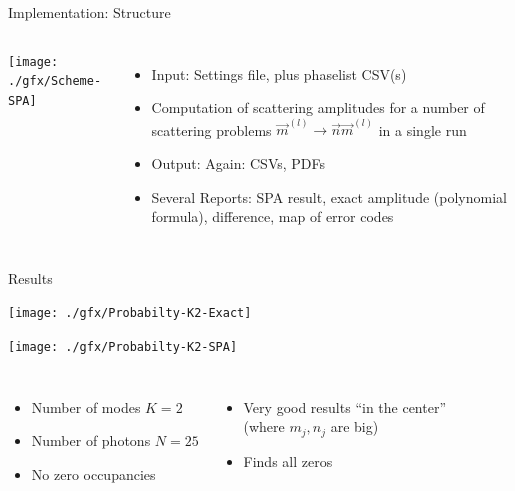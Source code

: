\begin{frame}{Implementation: Structure}
%
\vspace{-15pt}
\begin{columns}[t]
\begin{center}
	\texttt{[image: ./gfx/Scheme-SPA]}
\end{center}
%
\begin{itemize}
\item Input: Settings file, plus phaselist CSV(s)
\item Computation of scattering amplitudes for a number of scattering problems $\vec{m}^{(l)} \to \vec{n}\vec{m}^{(l)}$ in a single run
\item Output: Again: CSVs, PDFs
\item Several Reports: SPA result, exact amplitude (polynomial formula), difference, map of error codes
\end{itemize}
\end{columns}
%
\end{frame}


\begin{frame}{Results}
%
\begin{minipage}{.49\linewidth}
	\texttt{[image: ./gfx/Probabilty-K2-Exact]}
\end{minipage}
%
\begin{minipage}{.49\linewidth}
	\texttt{[image: ./gfx/Probabilty-K2-SPA]}
\end{minipage}
%
\begin{columns}[t]
\begin{itemize}
\item Number of modes $K = 2$
\item Number of photons $N = 25$
\item No zero occupancies
\end{itemize}
%
\begin{itemize}
\item Very good results \enquote{in the center}\\
	(where $m_j, n_j$ are big)
\item Finds all zeros
\end{itemize}
\end{columns}
%
\end{frame}


